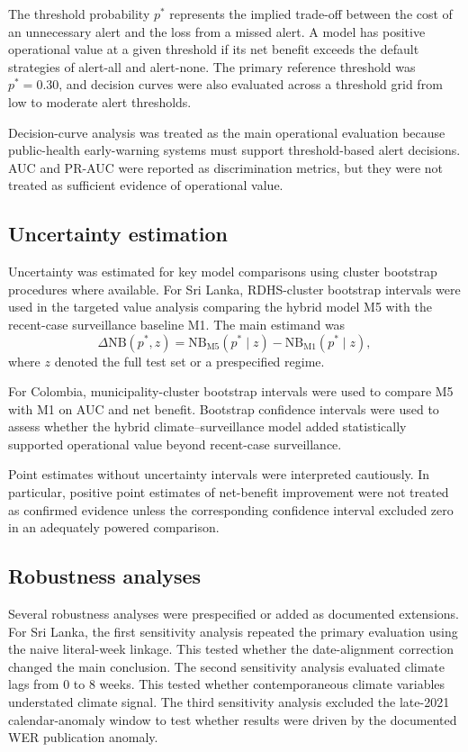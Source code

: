 \documentclass[11pt,a4paper]{article}
\begin{document}
The threshold probability $p^*$ represents the implied trade-off between the cost of an unnecessary alert and the loss from a missed alert. A model has positive operational value at a given threshold if its net benefit exceeds the default strategies of alert-all and alert-none. The primary reference threshold was $p^*=0.30$, and decision curves were also evaluated across a threshold grid from low to moderate alert thresholds.

Decision-curve analysis was treated as the main operational evaluation because public-health early-warning systems must support threshold-based alert decisions. AUC and PR-AUC were reported as discrimination metrics, but they were not treated as sufficient evidence of operational value.

\subsection{Uncertainty estimation}
\label{subsec:uncertainty-estimation}

Uncertainty was estimated for key model comparisons using cluster bootstrap procedures where available. For Sri Lanka, RDHS-cluster bootstrap intervals were used in the targeted value analysis comparing the hybrid model M5 with the recent-case surveillance baseline M1. The main estimand was
\[
\Delta \mathrm{NB}(p^*,z)
=
\mathrm{NB}_{\mathrm{M5}}(p^* \mid z)
-
\mathrm{NB}_{\mathrm{M1}}(p^* \mid z),
\]
where $z$ denoted the full test set or a prespecified regime.

For Colombia, municipality-cluster bootstrap intervals were used to compare M5 with M1 on AUC and net benefit. Bootstrap confidence intervals were used to assess whether the hybrid climate--surveillance model added statistically supported operational value beyond recent-case surveillance.

Point estimates without uncertainty intervals were interpreted cautiously. In particular, positive point estimates of net-benefit improvement were not treated as confirmed evidence unless the corresponding confidence interval excluded zero in an adequately powered comparison.

\subsection{Robustness analyses}
\label{subsec:robustness-analyses}

Several robustness analyses were prespecified or added as documented extensions. For Sri Lanka, the first sensitivity analysis repeated the primary evaluation using the naive literal-week linkage. This tested whether the date-alignment correction changed the main conclusion. The second sensitivity analysis evaluated climate lags from 0 to 8 weeks. This tested whether contemporaneous climate variables understated climate signal. The third sensitivity analysis excluded the late-2021 calendar-anomaly window to test whether results were driven by the documented WER publication anomaly.
\end{document}
